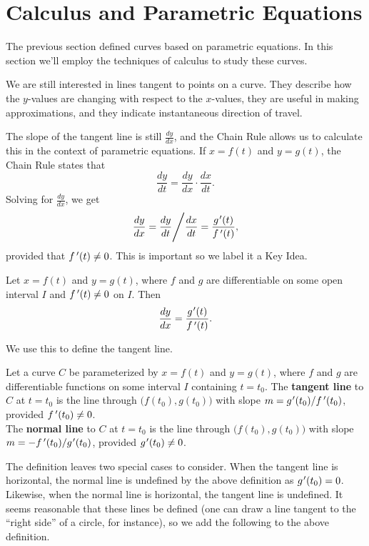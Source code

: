 \section{Calculus and Parametric Equations}\label{sec:par_calc}

The previous section defined curves based on parametric equations. In this section we'll employ the techniques of calculus to study these curves.

We are still interested in lines tangent to points on a curve. They describe how the $y$-values are changing with respect to the $x$-values, they are useful in making approximations, and they indicate instantaneous direction of travel.

The slope of the tangent line is still $\frac{dy}{dx}$, and the Chain Rule allows us to calculate this in the context of parametric equations. If $x=f(t)$ and $y=g(t)$, the Chain Rule states that $$\frac{dy}{dt} = \frac{dy}{dx}\cdot\frac{dx}{dt}.$$
Solving for $\frac{dy}{dx}$, we get 
$$\frac{dy}{dx} = \frac{dy}{dt}\Bigg/\frac{dx}{dt} = \frac{g\hskip.75pt'(t)}{f\,'(t)},$$
provided that $f\,'(t)\neq 0$. This is important so we label it a Key Idea.

{Let $x=f(t)$ and $y=g(t)$, where $f$ and $g$ are differentiable on some open interval $I$ and $f\,'(t)\neq 0$ on $I$. Then 
$$\frac{dy}{dx} = \frac{g\hskip.75pt'(t)}{f\,'(t)}.$$
}

We use this to define the tangent line.

{Let a curve $C$ be parameterized by $x=f(t)$ and $y=g(t)$, where $f$ and $g$ are differentiable functions on some interval $I$ containing $t=t_0$. The \textbf{tangent line} to $C$ at $t=t_0$ is the line through $\big(f(t_0),g(t_0)\big)$ with slope $m=g\hskip.75pt'(t_0)/f\,'(t_0)$, provided $f\,'(t_0)\neq 0$.\\

The \textbf{normal line} to $C$ at $t=t_0$ is the line through $\big(f(t_0),g(t_0)\big)$ with slope $m=-f\,'(t_0)/g\hskip.75pt'(t_0)$, provided $g\hskip.75pt'(t_0)\neq 0$.
}

The definition leaves two special cases to consider. When the tangent line is horizontal, the normal line is undefined by the above definition as $g\hskip.75pt'(t_0)=0$. Likewise, when the normal line is horizontal, the tangent line is undefined. It seems reasonable that these lines be defined (one can draw a line tangent to the ``right side'' of a circle, for instance), so we add the following to the above definition.

